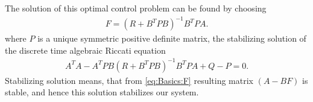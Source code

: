 The solution of this optimal control problem can be found by choosing 
\begin{align}
\label{eq:Basics:F}
F = (R + B^T P B)^{-1}B^TPA.
\end{align}
where $P$ is a unique symmetric positive definite matrix, the stabilizing solution of the discrete time algebraic Riccati equation
\begin{align}
 A^TA - A^T P B (R + B^T P B)^{-1} B^T P A + Q - P = 0.%
\end{align}
Stabilizing solution means, that from \eqref{eq:Basics:F} resulting matrix $(A - BF)$ is stable, and hence this solution stabilizes our system. 




 




%
%
%

